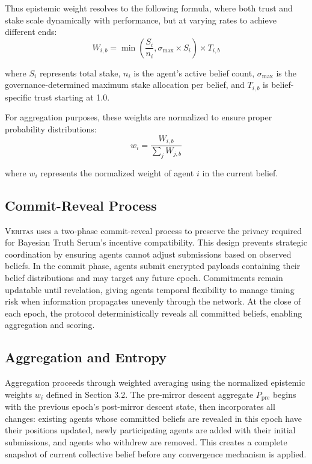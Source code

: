 \documentclass[11pt,a4paper]{article}
\newcommand{\veritas}{\textsc{Veritas}}
\begin{document}
Thus epistemic weight resolves to the following formula, where both trust and stake scale dynamically with performance, but at varying rates to achieve different ends:
$$W_{i,b} = \min\left(\frac{S_i}{n_i}, \sigma_{\text{max}} \times S_i\right) \times T_{i,b}$$

where $S_i$ represents total stake, $n_i$ is the agent's active belief count, $\sigma_{\text{max}}$ is the governance-determined maximum stake allocation per belief, and $T_{i,b}$ is belief-specific trust starting at 1.0.

For aggregation purposes, these weights are normalized to ensure proper probability distributions:
$$w_i = \frac{W_{i,b}}{\sum_j W_{j,b}}$$

where $w_i$ represents the normalized weight of agent $i$ in the current belief.

\subsection{Commit-Reveal Process}

\veritas{} uses a two-phase commit-reveal process to preserve the privacy required for Bayesian Truth Serum's incentive compatibility. This design prevents strategic coordination by ensuring agents cannot adjust submissions based on observed beliefs. In the commit phase, agents submit encrypted payloads containing their belief distributions and may target any future epoch. Commitments remain updatable until revelation, giving agents temporal flexibility to manage timing risk when information propagates unevenly through the network. At the close of each epoch, the protocol deterministically reveals all committed beliefs, enabling aggregation and scoring.

\subsection{Aggregation and Entropy}

Aggregation proceeds through weighted averaging using the normalized epistemic weights $w_i$ defined in Section 3.2. The pre-mirror descent aggregate $P_{\text{pre}}$ begins with the previous epoch's post-mirror descent state, then incorporates all changes: existing agents whose committed beliefs are revealed in this epoch have their positions updated, newly participating agents are added with their initial submissions, and agents who withdrew are removed. This creates a complete snapshot of current collective belief before any convergence mechanism is applied.
\end{document}
